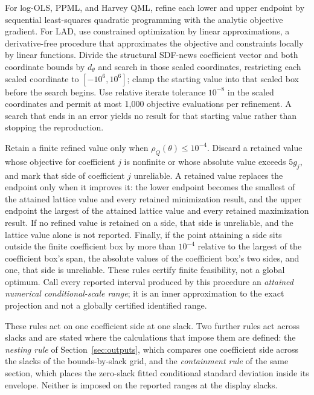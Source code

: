 \documentclass[11pt]{article}
\begin{document}
For log-OLS, PPML, and Harvey QML, refine each lower and upper endpoint by sequential least-squares
quadratic programming with the analytic objective gradient. For LAD, use constrained optimization by
linear approximations, a derivative-free procedure that approximates the objective and constraints
locally by linear functions. Divide the structural SDF-news coefficient vector and both coordinate
bounds by \(d_\theta\) and search in those scaled coordinates, restricting each scaled coordinate to
\([-10^6,10^6]\); clamp the starting value into that scaled box before the search begins. Use relative
iterate tolerance \(10^{-8}\) in the scaled coordinates and permit at most 1,000 objective evaluations
per refinement. A search that ends in an error yields no result for that starting value rather than
stopping the reproduction.

Retain a finite refined value only when \(\rho_Q(\theta)\le10^{-4}\). Discard a retained value whose objective
for coefficient \(j\) is nonfinite or whose absolute value exceeds \(5g_j\), and mark
that side of coefficient \(j\) unreliable. A retained value replaces the endpoint only when it improves it: the lower endpoint
becomes the smallest of the attained lattice value and every retained minimization result, and the
upper endpoint the largest of the attained lattice value and every retained maximization result. If no
refined value is retained on a side, that side is unreliable, and the lattice value alone is not
reported. Finally, if the point attaining a side sits outside the finite coefficient box by more than
\(10^{-4}\) relative to the largest of the coefficient box's span, the absolute values of the
coefficient box's two sides, and one,
that side is unreliable. These rules certify finite feasibility, not a global optimum. Call every
reported interval produced by this procedure an \emph{attained numerical conditional-scale range};
it is an inner approximation to the exact projection and not a globally certified identified range.

These rules act on one coefficient side at one slack. Two further rules act across slacks and are
stated where the calculations that impose them are defined: the \emph{nesting rule} of
Section~\ref{sec:outputs}, which compares one coefficient side across the slacks of the
bounds-by-slack grid, and the \emph{containment rule} of the same section, which places the zero-slack fitted conditional
standard deviation inside its envelope. Neither is imposed on the reported ranges at the display slacks.
\end{document}
